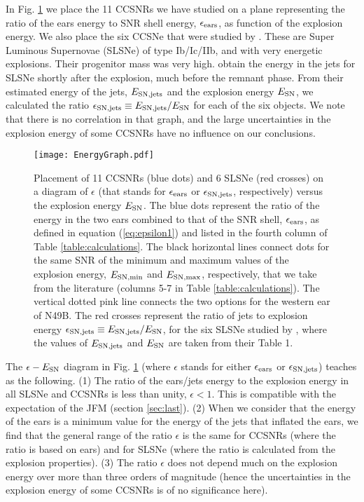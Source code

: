 \documentclass[12pt,preprint,a4paper]{aastex}
\begin{document}
In Fig. \ref{figure:EnergyGraph} we place the 11 CCSNRs we have studied on a plane representing the ratio of the ears energy to SNR shell energy, $\epsilon_{\rm ears}$, as function of the explosion energy. We also place the six CCSNe that were studied by \cite{Piranetal2017}. These are Super Luminous Supernovae (SLSNe) of type Ib/Ic/IIb, and with very energetic explosions. Their progenitor mass was very high.  
\cite{Piranetal2017} obtain the energy in the jets for SLSNe shortly after the explosion, much before the remnant phase. From their estimated energy of the jets, $E_{\rm SN,jets}$ and the explosion energy $E_{\rm SN}$, we calculated the ratio $\epsilon_{\rm SN,jets} \equiv E_{\rm SN,jets}/E_{\rm SN}$ for each of the six objects. We note that there is no correlation in that graph, and the large uncertainties in the explosion energy of some CCSNRs have no influence on our conclusions.  
\begin{figure} %
\centering
\texttt{[image: EnergyGraph.pdf]}
\caption{Placement of 11 CCSNRs (blue dots) and 6 SLSNe (red crosses) on a diagram of $\epsilon$ (that stands for $\epsilon_{\rm ears}$ or $\epsilon_{\rm SN, jets}$, respectively) versus the explosion energy $E_{\rm SN}$. 
The blue dots represent the ratio of the energy in the two ears combined to that of the SNR shell, $\epsilon_{\rm ears}$, as defined in equation (\ref{eq:epsilon1}) and listed in the fourth column of Table \ref{table:calculations}. The black horizontal lines connect dots for the same SNR of the minimum and maximum values of the explosion energy, 
$E_{\rm {SN,min}}$ and $E_{\rm {SN,max}}$, respectively, that we take from the literature (columns 5-7 in Table \ref{table:calculations}).  The vertical dotted pink line connects the two options for the western ear of N49B. The red crosses represent the ratio of jets to explosion energy 
$\epsilon_{\rm SN,jets} \equiv E_{\rm SN,jets}/E_{\rm SN}$, for the six SLSNe studied by \cite{Piranetal2017}, where the values of $E_{\rm SN,jets}$ and $E_{\rm SN}$ are taken from their Table 1. 
}
\label{figure:EnergyGraph}
\end{figure}

 The $\epsilon - E_{\rm SN}$ diagram in Fig. \ref{figure:EnergyGraph} (where $\epsilon$ stands for either $\epsilon_{\rm ears}$ or $\epsilon_{\rm SN,jets}$) teaches as the following. 
(1) The ratio of the ears/jets energy to the explosion energy in all SLSNe and CCSNRs is less than unity, $\epsilon <1$. This is compatible with the expectation of the JFM (section \ref{sec:last}). 
(2) When we consider that the energy of the ears is a minimum value for the energy of the jets that inflated the ears, we find that the general range of the ratio $\epsilon$ is the same for CCSNRs (where the ratio is based on ears) and for SLSNe (where the ratio is calculated from the explosion properties). 
(3) The ratio $\epsilon$ does not depend much on the explosion energy over more than three orders of magnitude (hence the uncertainties in the explosion energy of some CCSNRs is of no significance here). 
\end{document}
